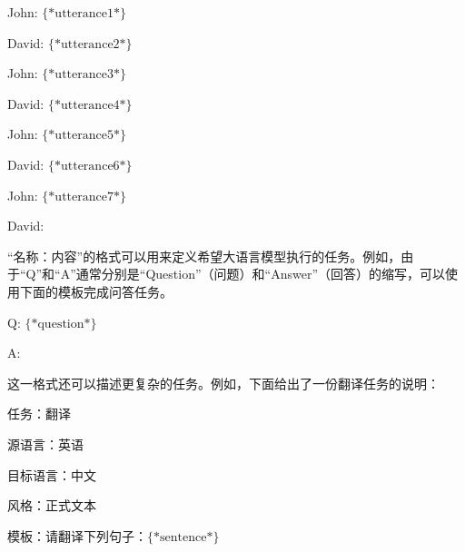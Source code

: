 \vspace{0.5em}
\begin{tcolorbox}

\hspace{2em} John: $\{*\mathrm{utterance1}*\}$

\hspace{2em} David: $\{*\mathrm{utterance2}*\}$

\hspace{2em} John: $\{*\mathrm{utterance3}*\}$

\hspace{2em} David: $\{*\mathrm{utterance4}*\}$

\hspace{2em} John: $\{*\mathrm{utterance5}*\}$

\hspace{2em} David: $\{*\mathrm{utterance6}*\}$

\hspace{2em} John: $\{*\mathrm{utterance7}*\}$

\hspace{2em} David: \underline{\hspace{2em}}

\end{tcolorbox}
\vspace{0.5em}

“名称：内容”的格式可以用来定义希望大语言模型执行的任务。例如，由于“Q”和“A”通常分别是“Question”（问题）和“Answer”（回答）的缩写，可以使用下面的模板完成问答任务。

\vspace{0.5em}
\begin{tcolorbox}

\hspace{2em} Q: $\{*\mathrm{question}*\}$

\hspace{2em} A: \underline{\hspace{2em}}

\end{tcolorbox}
\vspace{0.5em}

这一格式还可以描述更复杂的任务。例如，下面给出了一份翻译任务的说明：

\vspace{0.5em}
\begin{tcolorbox}

\hspace{2em} 任务：翻译

\hspace{2em} 源语言：英语

\hspace{2em} 目标语言：中文

\hspace{2em} 风格：正式文本

\hspace{2em} 模板：请翻译下列句子：$\{*\mathrm{sentence}*\}$

\hspace{2em} \underline{\hspace{2em}}

\end{tcolorbox}
\vspace{0.5em}

